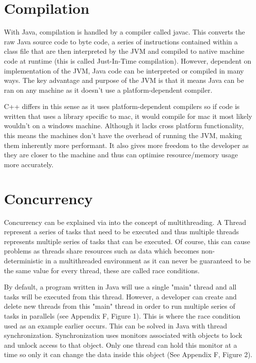 \documentclass[]{report}
\begin{document}
\section{Compilation}
With Java, compilation is handled by a compiler called javac. This converts the raw Java source code to byte code, a series of instructions contained within a class file that are then interpreted by the JVM and compiled to native machine code at runtime (this is called Just-In-Time compilation). However, dependent on implementation of the JVM, Java code can be interpreted or compiled in many ways. The key advantage and purpose of the JVM is that it means Java can be ran on any machine as it doesn't use a platform-dependent compiler.

C++ differs in this sense as it uses platform-dependent compilers so if code is written that uses a library specific to mac, it would compile for mac it most likely wouldn't on a windows machine. Although it lacks cross platform functionality, this means the machines don't have the overhead of running the JVM, making them inherently more performant. It also gives more freedom to the developer as they are closer to the machine	and thus can optimise resource/memory usage more accurately.

\section{Concurrency}
Concurrency can be explained via into the concept of multithreading. A Thread represent a series of tasks that need to be executed and thus multiple threads represents multiple series of tasks that can be executed.  Of course, this can cause problems as threads share resources such as data which becomes non-deterministic in a multithreaded environment as it can never be guaranteed to be the same value for every thread, these are called race conditions.

By default, a program written in Java will use a single "main" thread and all tasks will be executed from this thread. However, a developer can create and delete new threads from this "main" thread in order to run multiple series of tasks in parallels (see Appendix F, Figure 1). This is where the race condition used as an example earlier occurs. This can be solved in Java with thread synchronization. Synchronization uses monitors associated with objects to lock and unlock access to that object. Only one thread can hold this monitor at a time so only it can change the data inside this object (See Appendix F, Figure 2).
\end{document}

